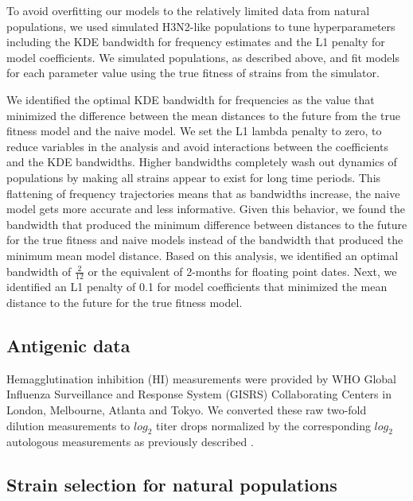 To avoid overfitting our models to the relatively limited data from natural populations, we used simulated H3N2-like populations to tune hyperparameters including the KDE bandwidth for frequency estimates and the L1 penalty for model coefficients.
We simulated populations, as described above, and fit models for each parameter value using the true fitness of strains from the simulator.

We identified the optimal KDE bandwidth for frequencies as the value that minimized the difference between the mean distances to the future from the true fitness model and the naive model.
We set the L1 lambda penalty to zero, to reduce variables in the analysis and avoid interactions between the coefficients and the KDE bandwidths.
Higher bandwidths completely wash out dynamics of populations by making all strains appear to exist for long time periods.
This flattening of frequency trajectories means that as bandwidths increase, the naive model gets more accurate and less informative.
Given this behavior, we found the bandwidth that produced the minimum difference between distances to the future for the true fitness and naive models instead of the bandwidth that produced the minimum mean model distance.
Based on this analysis, we identified an optimal bandwidth of $\frac{2}{12}$ or the equivalent of 2-months for floating point dates.
Next, we identified an L1 penalty of 0.1 for model coefficients that minimized the mean distance to the future for the true fitness model.

\subsection*{Antigenic data}

Hemagglutination inhibition (HI) measurements were provided by WHO Global Influenza Surveillance and Response System (GISRS) Collaborating Centers in London, Melbourne, Atlanta and Tokyo.
We converted these raw two-fold dilution measurements to $log_{2}$ titer drops normalized by the corresponding $log_{2}$ autologous measurements as previously described \cite{Neher:2016hy}.

\subsection*{Strain selection for natural populations}

